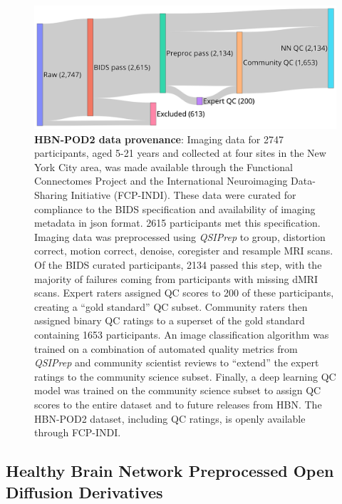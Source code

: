 \documentclass[9pt,lineno]{elife}
\begin{document}
\begin{figure}[tbp]
    \centering
    \includegraphics[width=0.75\linewidth]{hbn-pod2-sankey.png}
    \caption{%
        {\bf HBN-POD2 data provenance}:
        Imaging data for \num{2747} participants, aged 5-21 years and collected at four
        sites in the New York City area, was made available through the
        Functional Connectomes Project and the International Neuroimaging
        Data-Sharing Initiative (FCP-INDI).
        These data were curated for compliance to the BIDS specification
        \citep{gorgolewski2016-lh} and availability of imaging metadata in json
        format. \num{2615} participants met this specification.
        Imaging data was preprocessed using \emph{QSIPrep} \citep{cieslak2021-iq}
        to group, distortion correct, motion correct, denoise, coregister and
        resample MRI scans. Of the BIDS curated participants, \num{2134}
        passed this step, with the majority of failures coming from participants
        with missing dMRI scans.
        Expert raters assigned QC scores to \num{200} of these participants,
        creating a ``gold standard'' QC subset. Community raters then assigned
        binary QC ratings to a superset of the gold standard containing
        \num{1653} participants. An image classification algorithm was trained
        on a combination of automated quality metrics from \emph{QSIPrep} and community
        scientist reviews to ``extend'' the expert ratings to the community
        science subset. Finally, a deep learning QC model was trained on the
        community science subset to assign QC scores to the entire dataset and
        to future releases from HBN.
        The HBN-POD2 dataset, including QC ratings, is openly available through
        FCP-INDI.
    }
    \label{fig:hbn-sankey}
\end{figure}

 
\subsection{Healthy Brain Network Preprocessed Open Diffusion Derivatives}
\end{document}
